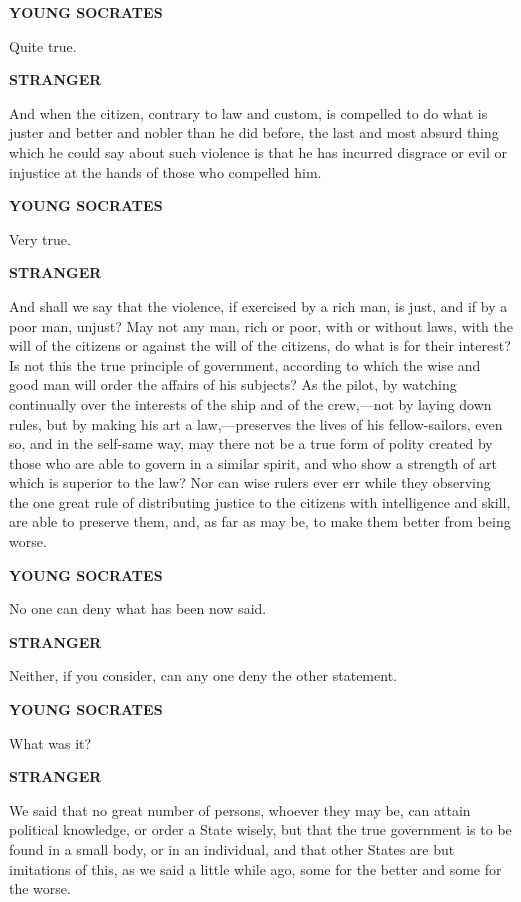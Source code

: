 \documentclass[11pt,letter]{article}
\begin{document}
\par \textbf{YOUNG SOCRATES}
\par   Quite true.

\par \textbf{STRANGER}
\par   And when the citizen, contrary to law and custom, is compelled to do what is juster and better and nobler than he did before, the last and most absurd thing which he could say about such violence is that he has incurred disgrace or evil or injustice at the hands of those who compelled him.

\par \textbf{YOUNG SOCRATES}
\par   Very true.

\par \textbf{STRANGER}
\par   And shall we say that the violence, if exercised by a rich man, is just, and if by a poor man, unjust? May not any man, rich or poor, with or without laws, with the will of the citizens or against the will of the citizens, do what is for their interest? Is not this the true principle of government, according to which the wise and good man will order the affairs of his subjects? As the pilot, by watching continually over the interests of the ship and of the crew,—not by laying down rules, but by making his art a law,—preserves the lives of his fellow-sailors, even so, and in the self-same way, may there not be a true form of polity created by those who are able to govern in a similar spirit, and who show a strength of art which is superior to the law? Nor can wise rulers ever err while they observing the one great rule of distributing justice to the citizens with intelligence and skill, are able to preserve them, and, as far as may be, to make them better from being worse.

\par \textbf{YOUNG SOCRATES}
\par   No one can deny what has been now said.

\par \textbf{STRANGER}
\par   Neither, if you consider, can any one deny the other statement.

\par \textbf{YOUNG SOCRATES}
\par   What was it?

\par \textbf{STRANGER}
\par   We said that no great number of persons, whoever they may be, can attain political knowledge, or order a State wisely, but that the true government is to be found in a small body, or in an individual, and that other States are but imitations of this, as we said a little while ago, some for the better and some for the worse.
\end{document}
